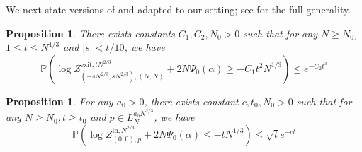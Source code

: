 \documentclass[11pt]{article}
\newtheorem{proposition}[theorem]{Proposition}
\theoremstyle{definition}
\newcommand{\Prob}{\mathbb{P}}
\begin{document}
We next state versions of
\cite[Corollary~3.14]{basu2024temporal} and
\cite[Theorem~3.16]{basu2024temporal} adapted to our setting; see
\cite{basu2024temporal} for the full generality.
\begin{proposition}\label{prop:exit}
    There exists constants $C_1, C_2, N_0 > 0$ such that for any $N \geq N_0$, $1 \leq t \leq N^{1/3}$ and $|s| < t/10$, we have
    \begin{equation}
        \Prob \left( \log Z^{\mathrm{exit}, tN^{2/3}}_{(-sN^{2/3}, sN^{2/3}), (N,N)} + 2N\Psi_0(\alpha) \geq -C_1t^2N^{1/3} \right)\leq  e^{-C_2t^3}
    \end{equation}
\end{proposition}
\begin{proposition}\label{prop:in}
    For any $a_0 > 0$, there exists constant $c, t_0, N_0 > 0$ such that for any $N \geq N_0, t \geq t_0$ and $p \in {L}_{N}^{a_0N^{2/3}}$, we have
    \begin{equation}
        \Prob \left(\log Z^{\mathrm{in}, N^{2/3}}_{(0,0), {p}}+ 2N\Psi_0(\alpha) \leq -tN^{1/3} \right) \leq \sqrt{t}e^{-ct}
    \end{equation}
\end{proposition}
\end{document}
